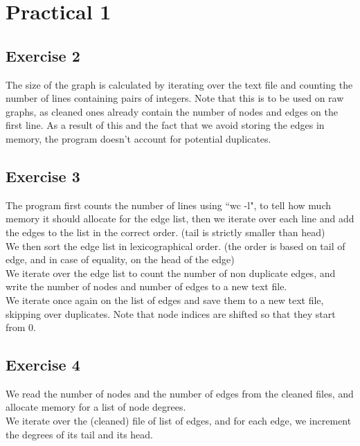 \documentclass{article}
\begin{document}
\section*{Practical 1}%
\subsection*{Exercise 2}%
\label{sub:tp1ex2}
The size of the graph is calculated by iterating over the text file and
counting the number of lines containing pairs of integers.
Note that this is to be used on raw graphs, as cleaned ones already contain the
number of nodes and edges on the first line.
As a result of this and the fact that we avoid storing the edges in memory, the
program doesn't account for potential duplicates.

\subsection*{Exercise 3}%
\label{sub:tp1ex3}
The program first counts the number of lines using ``wc -l", to tell how much
memory it should allocate for the edge list, then we iterate over each line
and add the edges to the list in the correct order.
(tail is strictly smaller than head)\\
We then sort the edge list in lexicographical order.
(the order is based on tail of edge, and in case of equality, on the head of the
edge)\\
We iterate over the edge list to count the number of non duplicate edges,
and write the number of nodes and number of edges to a new text file.\\
We iterate once again on the list of edges and save them to a new text file,
skipping over duplicates. Note that node indices are shifted so that they start
from 0.

\subsection*{Exercise 4}%
\label{sub:tp1ex4}
We read the number of nodes and the number of edges from the cleaned files, and
allocate memory for a list of node degrees.\\
We iterate over the (cleaned) file of list of edges, and for each edge, we
increment the degrees of its tail and its head.
\end{document}
